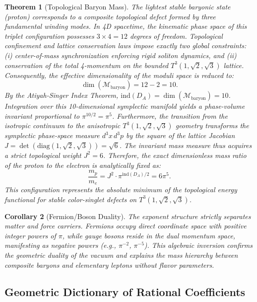 \documentclass[onecolumn,aps,prd,superscriptaddress,nofootinbib,amsmath,amssymb]{revtex4-2}
\newtheorem{theorem}{Theorem}[section]
\newtheorem{corollary}[theorem]{Corollary}
\theoremstyle{definition}
\theoremstyle{remark}
\newcommand{\Tthree}{T^3(1,\sqrt{2},\sqrt{3})}
\begin{document}
\begin{theorem}[Topological Baryon Mass]
\label{thm:baryon_mass}
The lightest stable baryonic state (proton) corresponds to a composite topological defect formed by three fundamental winding modes. In 4D spacetime, the kinematic phase space of this triplet configuration possesses $3 \times 4 = 12$ degrees of freedom. Topological confinement and lattice conservation laws impose exactly two global constraints: (i) center-of-mass synchronization enforcing rigid soliton dynamics, and (ii) conservation of the total 4-momentum on the bounded $\Tthree$ lattice. Consequently, the effective dimensionality of the moduli space is reduced to:
\begin{equation}
\dim(\mathcal{M}_{\text{baryon}}) = 12 - 2 = 10.
\end{equation}
By the Atiyah-Singer Index Theorem, $\text{ind}(D_A) = \dim(\mathcal{M}_{\text{baryon}}) = 10$. Integration over this 10-dimensional symplectic manifold yields a phase-volume invariant proportional to $\pi^{10/2} = \pi^5$. Furthermore, the transition from the isotropic continuum to the anisotropic $\Tthree$ geometry transforms the symplectic phase-space measure $d^3x \, d^3p$ by the square of the lattice Jacobian $J = \det(\text{diag}(1, \sqrt{2}, \sqrt{3})) = \sqrt{6}$. The invariant mass measure thus acquires a strict topological weight $J^2 = 6$.
Therefore, the exact dimensionless mass ratio of the proton to the electron is analytically fixed as:
\begin{equation}
\frac{m_p}{m_e} = J^2 \cdot \pi^{\text{ind}(D_A)/2} = 6\pi^5.
\label{eq:proton_exact}
\end{equation}
This configuration represents the absolute minimum of the topological energy functional for stable color-singlet defects on $\Tthree$.
\end{theorem}

\begin{corollary}[Fermion/Boson Duality]
The exponent structure strictly separates matter and force carriers. Fermions occupy direct coordinate space with positive integer powers of $\pi$, while gauge bosons reside in the dual momentum space, manifesting as negative powers (e.g., $\pi^{-2}$, $\pi^{-5}$). This algebraic inversion confirms the geometric duality of the vacuum and explains the mass hierarchy between composite baryons and elementary leptons without flavor parameters.
\end{corollary}

\subsection{Geometric Dictionary of Rational Coefficients}
\label{subsec:coeff_dictionary}
\end{document}
